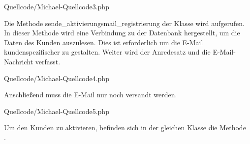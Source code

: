\begin{center}
	\begin{lstinputlisting}[language=PHP, caption={Aktivierungs-E-Mail versenden}]
		{Quellcode/Michael-Quellcode3.php}
	\end{lstinputlisting}
\end{center}

Die Methode \glqq sende\_aktivierungsmail\_registrierung\grqq{} der Klasse \grqq{} wird aufgerufen. In dieser Methode wird eine Verbindung zu der Datenbank hergestellt, um die Daten des Kunden auszulesen.  Dies ist erforderlich um die E-Mail kundenspezifischer zu gestalten.
Weiter wird der Anredesatz und die E-Mail-Nachricht verfasst.


\begin{center}
	\begin{lstinputlisting}[language=PHP, caption={Die E-Mail versenden}]
		{Quellcode/Michael-Quellcode4.php}
	\end{lstinputlisting}
\end{center}

\newpage
Anschließend muss die E-Mail nur noch versandt werden.


\begin{center}
	\begin{lstinputlisting}[language=PHP, caption={Anredesatz erstellen und E-Mail Nachricht verfassen}]
		{Quellcode/Michael-Quellcode5.php}
	\end{lstinputlisting}
\end{center}

Um den Kunden zu aktivieren, befinden sich in der gleichen Klasse die Methode \\
\grqq{}. 